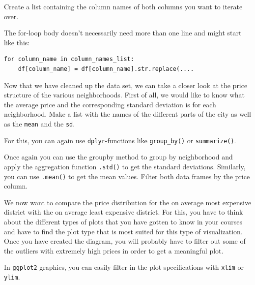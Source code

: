 \documentclass[
  11pt,
]{book}
\newenvironment{tips}[1]
  {
  \begin{itemize}
  \footnotesize
  \renewcommand{\labelitemi}{
    \raisebox{-.7\height}[0pt][0pt]{
      {\setkeys{Gin}{width=3em,keepaspectratio}
        \texttt{[image: images/\#1.png]}}
    }
  }
  \setlength{\fboxsep}{1em}
  \begin{rbox}
  \item
  }
  {
  \end{rbox}
  \end{itemize}
  }
\newenvironment{tipsp}[1]
  {
  \begin{itemize}
  \footnotesize
  \renewcommand{\labelitemi}{
    \raisebox{-.7\height}[0pt][0pt]{
      {\setkeys{Gin}{width=3em,keepaspectratio}
        \texttt{[image: images/\#1.png]}}
    }
  }
  \setlength{\fboxsep}{1em}
  \begin{pbox}
  \item
  }
  {
  \end{pbox}
  \end{itemize}
  }
\begin{document}
\begin{tipsp}p

Create a list containing the column names of both columns you want to iterate over.

The for-loop body doesn't necessarily need more than one line and might start like this:

\begin{verbatim}
for column_name in column_names_list:
    df[column_name] = df[column_name].str.replace(....
\end{verbatim}

\end{tipsp}

Now that we have cleaned up the data set, we can take a closer look at the price structure of the various neighborhoods. First of all, we would like to know what the average price and the corresponding standard deviation is for each neighborhood. Make a list with the names of the different parts of the city as well as the \texttt{mean} and the \texttt{sd}.

\begin{tips}r

For this, you can again use \texttt{dplyr}-functions like \texttt{group\_by()} or \texttt{summarize()}.

\end{tips}

\begin{tipsp}p

Once again you can use the groupby method to group by neighborhood and apply the aggregation function \texttt{.std()} to get the standard deviations. Similarly, you can use \texttt{.mean()} to get the mean values. Filter both data frames by the price column.

\end{tipsp}

We now want to compare the price distribution for the on average most expensive district with the on average least expensive district. For this, you have to think about the different types of plots that you have gotten to know in your courses and have to find the plot type that is most suited for this type of visualization. Once you have created the diagram, you will probably have to filter out some of the outliers with extremely high prices in order to get a meaningful plot.

\begin{tips}r

In \texttt{ggplot2} graphics, you can easily filter in the plot specifications with \texttt{xlim} or \texttt{ylim}.

\end{tips}
\end{document}
